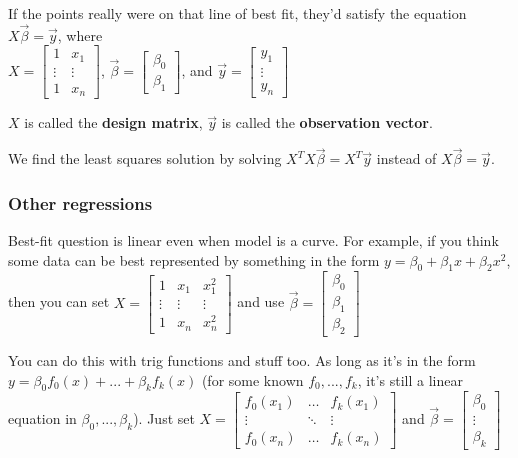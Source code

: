If the points really were on that line of best fit, they'd satisfy the equation $X\Vec{\beta} = \Vec{y}$, where\\
$\displaystyle X = \begin{bmatrix}1 & x_1 \\ \vdots & \vdots \\ 1 & x_n\end{bmatrix}$, $\Vec{\beta} = \begin{bmatrix}\beta_0 \\ \beta_1\end{bmatrix}$, and $\Vec{y} = \begin{bmatrix}y_1 \\ \vdots \\ y_n\end{bmatrix}$

$X$ is called the \textbf{design matrix}, $\Vec{y}$ is called the \textbf{observation vector}.

We find the least squares solution by solving $X^TX\Vec{\beta} = X^T\Vec y$ instead of $X\Vec{\beta} = \Vec y$.

\subsubsection*{Other regressions}

Best-fit question is linear even when model is a curve. For example, if you think some data can be best represented by something in the form $y = \beta_0 + \beta_1 x + \beta_2 x^2$, then you can set $X = \begin{bmatrix}1 & x_1 & x_1^2 \\ \vdots & \vdots & \vdots \\ 1 & x_n & x_n^2\end{bmatrix}$ and use $\Vec{\beta} = \begin{bmatrix}\beta_0 \\ \beta_1 \\ \beta_2\end{bmatrix}$

You can do this with trig functions and stuff too. As long as it's in the form $y = \beta_0f_0(x) + ... + \beta_kf_k(x)$ (for some known $f_0, ..., f_k$, it's still a linear equation in $\beta_0, ..., \beta_k$). Just set $X = \begin{bmatrix}f_0(x_1) & \hdots & f_k(x_1) \\ \vdots & \ddots & \vdots \\ f_0(x_n) & \hdots & f_k(x_n)\end{bmatrix}$ and $\Vec{\beta} = \begin{bmatrix}\beta_0 \\ \vdots \\ \beta_k\end{bmatrix}$


